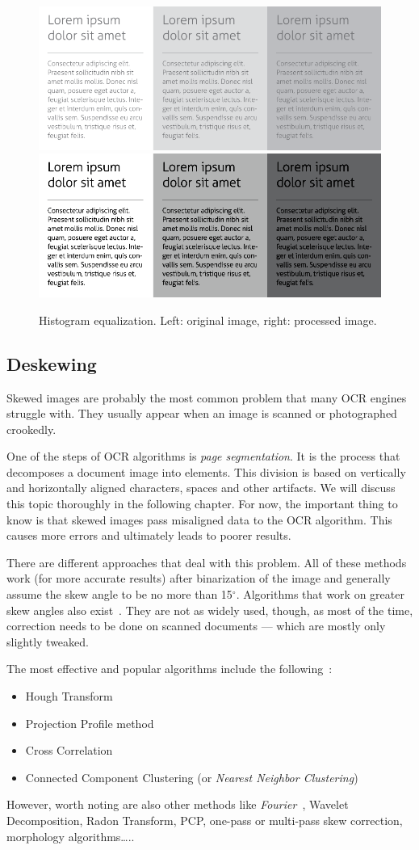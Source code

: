 \begin{figure}[t]
\centering
\includegraphics[width=0.4\linewidth]{img/preprocessing/contrast_low.png}
\qquad
\includegraphics[width=0.4\linewidth]{img/preprocessing/contrast_high.png}
\caption{Histogram equalization. Left: original image, right: processed image.}
\label{fig:preprocessHistogramEqualization}
\end{figure}


\subsection{Deskewing}

Skewed images are probably the most common problem that many OCR engines struggle with. They usually appear when an image is scanned or photographed crookedly. 

One of the steps of OCR algorithms is \emph{page segmentation}. It is the process that decomposes a document image into elements. This division is based on vertically and horizontally aligned characters, spaces and other artifacts. We will discuss this topic thoroughly in the following chapter. For now, the important thing to know is that skewed images pass misaligned data to the OCR algorithm. This causes more errors and ultimately leads to poorer results.

There are different approaches that deal with this problem. All of these methods work (for more accurate results) after binarization of the image and generally assume the skew angle to be no more than 15$^{\circ}$. Algorithms that work on greater skew angles also exist~\citep{skewAngleDetection}. They are not as widely used, though, as most of the time, correction needs to be done on scanned documents --- which are mostly only slightly tweaked.

The most effective and popular algorithms include the following~\citep{skewBestTechniques}:
\begin{itemize}
    \item Hough Transform
    \item Projection Profile method
    \item Cross Correlation
    \item Connected Component Clustering (or \emph{Nearest Neighbor Clustering})~\citep{skewClustering}
\end{itemize}
However, worth noting are also other methods like \emph{Fourier}~\citep{fourierTransform}, Wavelet Decomposition, Radon Transform, PCP, one-pass or multi-pass skew correction, morphology algorithms\ldots.. 


